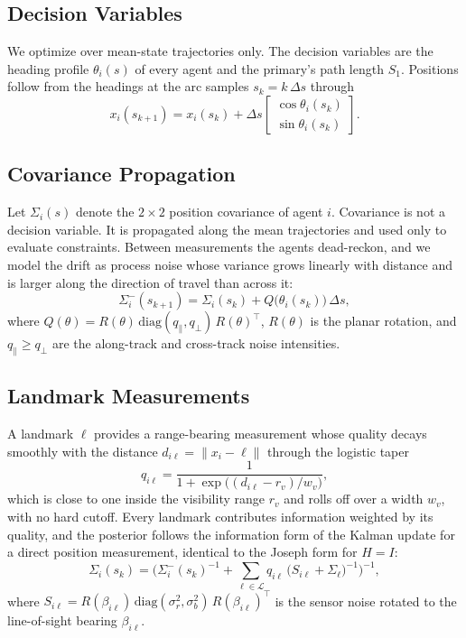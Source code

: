 \documentclass[letterpaper, 10 pt, conference]{ieeeconf}
\theoremstyle{remark}
\begin{document}
\subsection{Decision Variables}

We optimize over mean-state trajectories only. The decision variables are the
heading profile $\theta_i(s)$ of every agent and the primary's path length
$S_1$. Positions follow from the headings at the arc samples
$s_k = k\,\Delta s$ through
\begin{equation}
  x_i(s_{k+1}) = x_i(s_k) + \Delta s
  \begin{bmatrix} \cos\theta_i(s_k) \\ \sin\theta_i(s_k) \end{bmatrix}.
  \label{eq:dyn}
\end{equation}

\subsection{Covariance Propagation}

Let $\Sigma_i(s)$ denote the $2\times2$ position covariance of agent $i$.
Covariance is not a decision variable. It is propagated along the mean
trajectories and used only to evaluate constraints. Between measurements the
agents dead-reckon, and we model the drift as process noise whose variance
grows linearly with distance and is larger along the direction of travel than
across it:
\begin{equation}
  \Sigma_i^{-}(s_{k+1}) = \Sigma_i(s_k) + Q\big(\theta_i(s_k)\big)\,\Delta s,
  \label{eq:prop}
\end{equation}
where $Q(\theta) = R(\theta)\,\mathrm{diag}(q_\parallel, q_\perp)\,R(\theta)^{\!\top}$,
$R(\theta)$ is the planar rotation, and $q_\parallel \ge q_\perp$ are the
along-track and cross-track noise intensities.

\subsection{Landmark Measurements}

A landmark $\ell$ provides a range-bearing measurement whose quality decays
smoothly with the distance $d_{i\ell} = \lVert x_i - \ell \rVert$ through the
logistic taper
\begin{equation}
  q_{i\ell} = \frac{1}{1 + \exp\!\big((d_{i\ell} - r_v)/w_v\big)},
  \label{eq:taper}
\end{equation}
which is close to one inside the visibility range $r_v$ and rolls off over a
width $w_v$, with no hard cutoff. Every landmark contributes information
weighted by its quality, and the posterior follows the information form of
the Kalman update for a direct position measurement, identical to the Joseph
form for $H = I$:
\begin{equation}
  \Sigma_i(s_k) = \Big( \Sigma_i^{-}(s_k)^{-1}
  + \sum_{\ell \in \mathcal{L}} q_{i\ell}\,\big(S_{i\ell} + \Sigma_\ell\big)^{-1} \Big)^{-1},
  \label{eq:lm}
\end{equation}
where $S_{i\ell} = R(\beta_{i\ell})\,\mathrm{diag}(\sigma_r^2, \sigma_b^2)\,R(\beta_{i\ell})^{\!\top}$
is the sensor noise rotated to the line-of-sight bearing $\beta_{i\ell}$.
\end{document}
